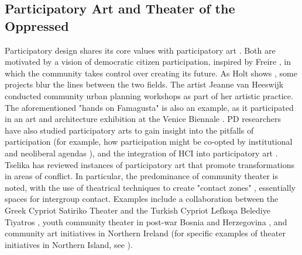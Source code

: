 \documentclass[dissertation,math,vertlayout,pdfa,colorlinks,nologo]{aaltoseries}
\begin{document}
\subsection{Participatory Art and Theater of the Oppressed}
Participatory design shares its core values with participatory art \cite{holtTransformationAestheticArt2015}. Both are motivated by a vision of democratic citizen participation, inspired by Freire \cite{matarassoRestlessArt2019}, in which the community takes control over creating its future. As Holt shows \cite{holtTransformationAestheticArt2015}, some projects blur the lines between the two fields. The artist Jeanne van Heeswijk conducted community urban planning workshops as part of her artistic practice\cite{vanheeswijkInclusiveUrbanStrategies2011}. The aforementioned "hands on Famagusta" is also an example, as it participated in an art and architecture exhibition at the Venice Biennale \cite{stratisReclaimingPoliticalUrbanism2017}. PD researchers have also studied participatory arts to gain insight into the pitfalls of participation (for example, how participation might be co-opted by institutional and neoliberal agendas \cite{balaGesturesParticipatoryArt2018}), and the integration of HCI into participatory art \cite{holmerConstructingConstrainingParticipation2015}. Tselika \cite{tselikaConflictTransformationArt2019} has reviewed instances of participatory art that promote transformations in areas of conflict. In particular, the predominance of community theater is noted, with the use of theatrical techniques to create "contact zones" \cite{prattImperialEyesTravel2008}, essentially spaces for intergroup contact. Examples include a collaboration between the Greek Cypriot Satiriko Theater and the Turkish Cypriot Lefkoşa Belediye Tiyatros \cite[p.17]{tselikaConflictTransformationArt2019}, youth community theater in post-war Bosnia and Herzegovina \cite{zelizerRoleArtisticProcesses2003}, and community art initiatives in Northern Ireland (for specific examples of theater initiatives in Northern Island, see \cite{pierseCreativelyConnectingCivil2020}).
\end{document}
